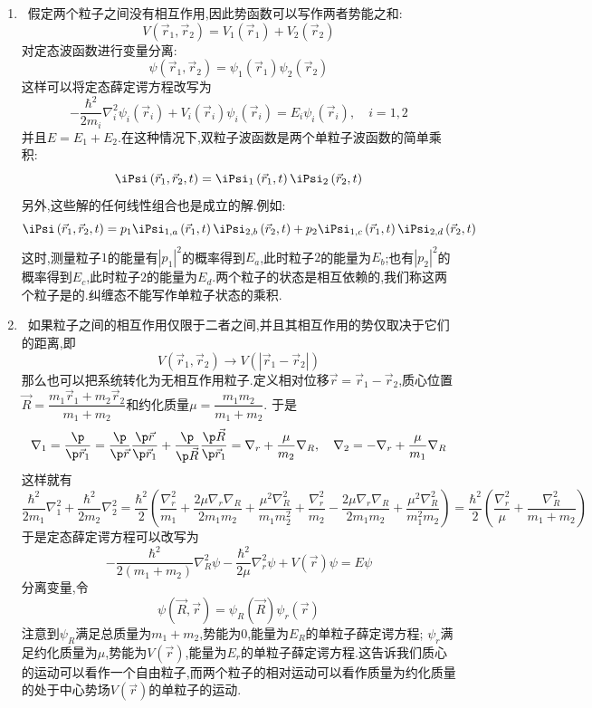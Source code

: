 \documentclass{ctexart}
\begin{document}
\begin{enumerate}[label=\tbf{\arabic*.},leftmargin=*]
    \item {}\ 假定两个粒子之间没有相互作用,因此势函数可以写作两者势能之和:
    \[V\left(\vec{r}_1,\vec{r}_2\right)=V_1\left(\vec{r}_1\right)+V_2\left(\vec{r}_2\right)\]
    对定态波函数进行变量分离:
    \[\psi\left(\vec{r}_1,\vec{r}_2\right)=\psi_1\left(\vec{r}_1\right)\psi_2\left(\vec{r}_2\right)\]
    这样可以将定态薛定谔方程改写为
    \[-\dfrac{\hbar^2}{2m_i}\nabla_i^2\psi_i\left(\vec{r}_i\right)+V_i\left(\vec{r}_i\right)\psi_i\left(\vec{r}_i\right)=E_i\psi_i\left(\vec{r}_i\right),\quad i=1,2\]
    并且$E=E_1+E_2$.在这种情况下,双粒子波函数是两个单粒子波函数的简单乘积:
    \[\iPsi\left(\vec{r}_1,\vec{r}_2,t\right)=\iPsi_1\left(\vec{r}_1,t\right)\iPsi_2\left(\vec{r}_2,t\right)\]
    另外,这些解的任何线性组合也是成立的解.例如:
    \[\iPsi\left(\vec{r}_1,\vec{r}_2,t\right)=p_1\iPsi_{1,a}\left(\vec{r}_1,t\right)\iPsi_{2,b}\left(\vec{r}_2,t\right)+p_2\iPsi_{1,c}\left(\vec{r}_1,t\right)\iPsi_{2,d}\left(\vec{r}_2,t\right)\]
    这时,测量粒子$1$的能量有$\left|p_1\right|^2$的概率得到$E_a$,此时粒子$2$的能量为$E_b$;也有$\left|p_2\right|^2$的概率得到$E_c$,此时粒子$2$的能量为$E_d$.两个粒子的状态是相互依赖的,我们称这两个粒子是的.纠缠态不能写作单粒子状态的乘积.
    \item {}\ 如果粒子之间的相互作用仅限于二者之间,并且其相互作用的势仅取决于它们的距离,即
    \[V\left(\vec{r}_1,\vec{r}_2\right)\to V\left(\left|\vec{r}_1-\vec{r}_2\right|\right)\]
    那么也可以把系统转化为无相互作用粒子.定义相对位移$\vec{r}=\vec{r}_1-\vec{r}_2$,质心位置$\vec{R}=\dfrac{m_1\vec{r}_1+m_2\vec{r}_2}{m_1+m_2}$和约化质量$\mu=\dfrac{m_1m_2}{m_1+m_2}$.
    于是
    \[\nabla_1=\dfrac{\p}{\p\vec{r}_1}=\dfrac{\p}{\p\vec{r}}\dfrac{\p\vec{r}}{\p\vec{r}_1}+\dfrac{\p}{\p\vec{R}}\dfrac{\p\vec{R}}{\p\vec{r}_1}=\nabla_r+\dfrac{\mu}{m_2}\nabla_R,\quad\nabla_2=-\nabla_r+\dfrac{\mu}{m_1}\nabla_R\]
    这样就有
    \[\dfrac{\hbar^2}{2m_1}\nabla_1^2+\dfrac{\hbar^2}{2m_2}\nabla_2^2=\dfrac{\hbar^2}{2}\left(\dfrac{\nabla_r^2}{m_1}+\dfrac{2\mu\nabla_r\nabla_R}{2m_1m_2}+\dfrac{\mu^2\nabla_R^2}{m_1m_2^2}+\dfrac{\nabla_r^2}{m_2}-\dfrac{2\mu\nabla_r\nabla_R}{2m_1m_2}+\dfrac{\mu^2\nabla_R^2}{m_1^2m_2}\right)=\dfrac{\hbar^2}{2}\left(\dfrac{\nabla_r^2}{\mu}+\dfrac{\nabla_R^2}{m_1+m_2}\right)\]
    于是定态薛定谔方程可以改写为
    \[-\dfrac{\hbar^2}{2\left(m_1+m_2\right)}\nabla_R^2\psi-\dfrac{\hbar^2}{2\mu}\nabla_r^2\psi+V(\vec{r})\psi=E\psi\]
    分离变量,令
    \[\psi\left(\vec{R},\vec{r}\right)=\psi_R(\vec{R})\psi_r(\vec{r})\]
    注意到$\psi_R$满足总质量为$m_1+m_2$,势能为$0$,能量为$E_R$的单粒子薛定谔方程; $\psi_r$满足约化质量为$\mu$,势能为$V(\vec{r})$,能量为$E_r$的单粒子薛定谔方程.这告诉我们质心的运动可以看作一个自由粒子,而两个粒子的相对运动可以看作质量为约化质量的处于中心势场$V(\vec{r})$的单粒子的运动.
\end{enumerate}
\end{document}
